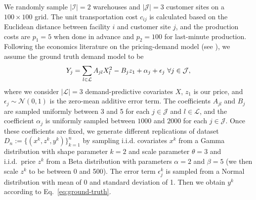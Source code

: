 \documentclass[onefignum,onetabnum]{siamart251216}
\begin{document}
We randomly sample $|\mathcal{I}|=2$ warehouses and $|\mathcal{J}|=3$ customer sites on a $100\times 100$ grid. The unit transportation cost $c_{ij}$ is calculated based on the Euclidean distance between facility $i$ and customer site $j$, and the production costs are $p_1=5$ when done in advance and $p_2=100$ for last-minute production. Following the economics literature on the pricing-demand model (see \cite{petruzzi1999pricing,chen2004coordinating,chen2007risk}), we assume the ground truth demand model to be\vspace*{-0.05in} 
\begin{align}
    Y_j= \sum_{l\in\mathcal{L}}A_{jl}X_l^2-B_jz_1+\alpha_j+\epsilon_j\ \forall j \in \mathcal{J},\label{eq:ground-truth} \vspace*{-0.05in}
\end{align}
where we consider $|\mathcal{L}|=3$ demand-predictive covariates $X$, $z_1$ is our price, and $\epsilon_j\sim\mathcal{N}(0,1)$ is the zero-mean additive error term.  The coefficients $A_{jl}$ and $B_j$ are sampled uniformly between 3 and 5 for each $j\in\mathcal{J}$ and $l\in\mathcal{L}$, and the coefficient $\alpha_j$ is uniformly sampled between $1000$ and $2000$ for each $j\in\mathcal{J}$. Once these coefficients are fixed, we generate different replications of dataset $D_n:=\{(x^k,z^k,y^k)\}_{k=1}^n$ by sampling i.i.d. covariates $x^k$ from a Gamma distribution with shape parameter $k=2$ and scale parameter $\theta=3$ and i.i.d.\ price $z^k$ from a Beta distribution with parameters $\alpha =2$ and $\beta = 5$ (we then scale $z^k$ to be between 0 and 500). The error term $\epsilon_j^k$ is sampled from a Normal distribution with mean of 0 and standard deviation of 1. Then we obtain $y^k$ according to Eq.~\eqref{eq:ground-truth}.
\end{document}
